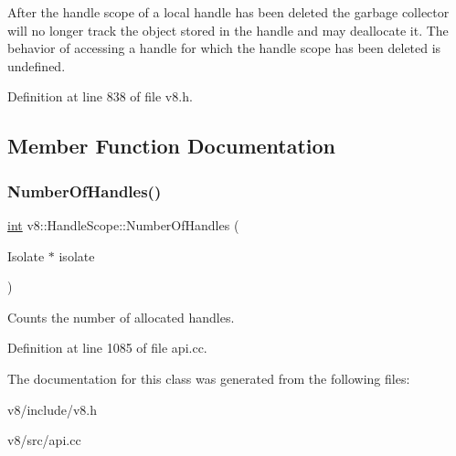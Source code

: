 After the handle scope of a local handle has been deleted the garbage collector will no longer track the object stored in the handle and may deallocate it. The behavior of accessing a handle for which the handle scope has been deleted is undefined. 

Definition at line 838 of file v8.\+h.



\subsection{Member Function Documentation}
\mbox{\label{classv8_1_1HandleScope_aac722821557f314a9cbe6b8ed8fc9d01}} 
\subsubsection{\texorpdfstring{Number\+Of\+Handles()}{NumberOfHandles()}}
{\footnotesize\ttfamily \mbox{\hyperlink{classint}{int}} v8\+::\+Handle\+Scope\+::\+Number\+Of\+Handles (\begin{DoxyParamCaption}\item[{Isolate $\ast$}]{isolate }\end{DoxyParamCaption})\hspace{0.3cm}{\ttfamily [static]}}

Counts the number of allocated handles. 

Definition at line 1085 of file api.\+cc.



The documentation for this class was generated from the following files\+:\begin{DoxyCompactItemize}
\item 
v8/include/v8.\+h\item 
v8/src/api.\+cc\end{DoxyCompactItemize}
